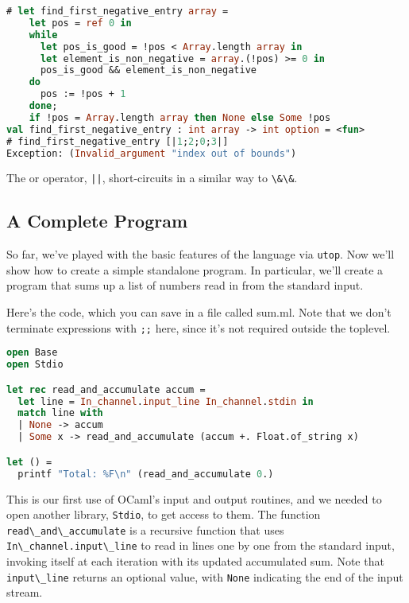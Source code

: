 \begin{lstlisting}[language=Caml]
# let find_first_negative_entry array =
    let pos = ref 0 in
    while
      let pos_is_good = !pos < Array.length array in
      let element_is_non_negative = array.(!pos) >= 0 in
      pos_is_good && element_is_non_negative
    do
      pos := !pos + 1
    done;
    if !pos = Array.length array then None else Some !pos
val find_first_negative_entry : int array -> int option = <fun>
# find_first_negative_entry [|1;2;0;3|]
Exception: (Invalid_argument "index out of bounds")
\end{lstlisting}

The or operator, \passthrough{\lstinline!||!}, short-circuits in a
similar way to \passthrough{\lstinline!\&\&!}.

\hypertarget{a-complete-program}{%
\subsection{A Complete Program}\label{a-complete-program}}

So far, we've played with the basic features of the language via
\passthrough{\lstinline!utop!}. Now we'll show how to create a simple
standalone program. In particular, we'll create a program that sums up a
list of numbers read in from the standard
input.

Here's the code, which you can save in a file called sum.ml. Note that
we don't terminate expressions with \passthrough{\lstinline!;;!} here,
since it's not required outside the toplevel.

\begin{lstlisting}[language=Caml]
open Base
open Stdio

let rec read_and_accumulate accum =
  let line = In_channel.input_line In_channel.stdin in
  match line with
  | None -> accum
  | Some x -> read_and_accumulate (accum +. Float.of_string x)

let () =
  printf "Total: %F\n" (read_and_accumulate 0.)
\end{lstlisting}

This is our first use of OCaml's input and output routines, and we
needed to open another library, \passthrough{\lstinline!Stdio!}, to get
access to them. The function
\passthrough{\lstinline!read\_and\_accumulate!} is a recursive function
that uses \passthrough{\lstinline!In\_channel.input\_line!} to read in
lines one by one from the standard input, invoking itself at each
iteration with its updated accumulated sum. Note that
\passthrough{\lstinline!input\_line!} returns an optional value, with
\passthrough{\lstinline!None!} indicating the end of the input stream.


